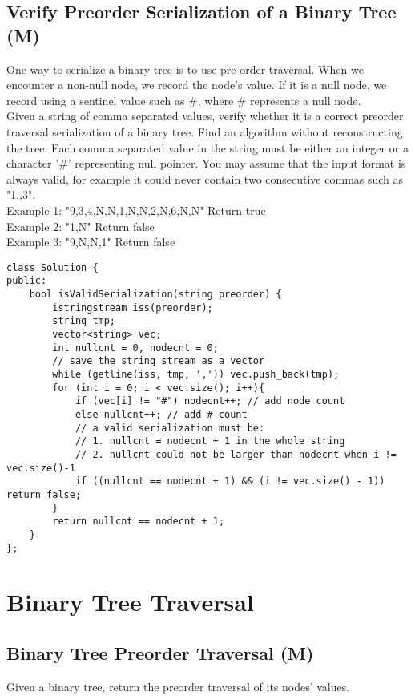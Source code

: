\subsection{Verify Preorder Serialization of a Binary Tree (M)}
One way to serialize a binary tree is to use pre-order traversal. When we encounter a non-null node, we record the node's value. If it is a null node, we record using a sentinel value such as \#, where \# represents a null node. \\

Given a string of comma separated values, verify whether it is a correct preorder traversal serialization of a binary tree. Find an algorithm without reconstructing the tree. Each comma separated value in the string must be either an integer or a character '\#' representing null pointer. You may assume that the input format is always valid, for example it could never contain two consecutive commas such as "1,,3". \\

Example 1:
"9,3,4,N,N,1,N,N,2,N,6,N,N"
Return true\\

Example 2:
"1,N"
Return false\\

Example 3:
"9,N,N,1"
Return false\\

\begin{lstlisting}
class Solution {
public:
    bool isValidSerialization(string preorder) {
        istringstream iss(preorder);
        string tmp;
        vector<string> vec;
        int nullcnt = 0, nodecnt = 0;
        // save the string stream as a vector
        while (getline(iss, tmp, ',')) vec.push_back(tmp); 
        for (int i = 0; i < vec.size(); i++){
            if (vec[i] != "#") nodecnt++; // add node count
            else nullcnt++; // add # count
            // a valid serialization must be:
            // 1. nullcnt = nodecnt + 1 in the whole string
            // 2. nullcnt could not be larger than nodecnt when i != vec.size()-1
            if ((nullcnt == nodecnt + 1) && (i != vec.size() - 1)) return false;
        }
        return nullcnt == nodecnt + 1;
    }
};
\end{lstlisting}


\section{Binary Tree Traversal}
\subsection{Binary Tree Preorder Traversal (M)}
Given a binary tree, return the preorder traversal of its nodes' values.\\

